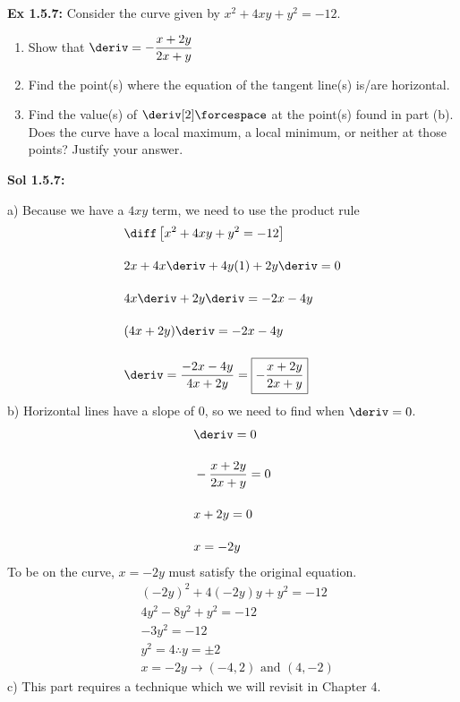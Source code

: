 \begin{tcolorbox}[example]
    \textbf{Ex 1.5.7: } Consider the curve given by $x^2 + 4xy + y^2 = -12$. \\
    \begin{enumerate}[label=\hspace{11pt}(\alph*), align=left, leftmargin=*, labelsep=0.25em]
        \item Show that $\deriv = -\dfrac{x + 2y}{2x + y}$ \\
        \item Find the point(s) where the equation of the tangent line(s) is/are horizontal. \\
        \item Find the value(s) of $\deriv[2] \forcespace$ at the point(s) found in part (b). Does the curve have a local maximum, a local minimum, or neither at those points? Justify your answer.
    \end{enumerate}
\end{tcolorbox} 
\begin{tcolorbox}[solution]
    \textbf{Sol 1.5.7: } \par
    a) Because we have a $4xy$ term, we need to use the product rule \begin{align*}
        & \diff \left[x^2 + 4xy + y^2 = -12\right] \\[11pt]
        & 2x + 4x\deriv + 4y(1) + 2y\deriv = 0 \\[11pt]
        & 4x\deriv+ 2y\deriv = -2x - 4y \\[11pt]
        & (4x + 2y)\deriv = -2x - 4y \\[11pt]
        & \deriv = \dfrac{-2x - 4y}{4x + 2y} = \boxed{-\dfrac{x + 2y}{2x + y}}
    \end{align*}
    b) Horizontal lines have a slope of $0$, so we need to find when $\deriv = 0$. \begin{align*}
        & \deriv = 0 \\[11pt]
        & -\dfrac{x + 2y}{2x + y} = 0 \\[11pt]
        & x + 2y = 0 \\[11pt]
        & x = -2y
    \end{align*}
    To be on the curve, $x = -2y$ must satisfy the original equation. \begin{align*}
        & (-2y)^2 + 4(-2y)y + y^2 = -12 \\[11pt]
        & 4y^2 - 8y^2 + y^2 = -12 \\[11pt]
        & -3y^2 = -12 \\[11pt]
        & y^2 = 4 \therefore y = \pm 2 \\[11pt]
        & x = -2y \rightarrow \boxed{(-4, 2) \text{ and } (4, -2)}
    \end{align*}
    c) This part requires a technique which we will revisit in Chapter 4.
\end{tcolorbox}

